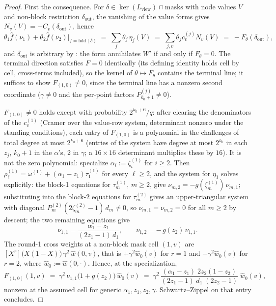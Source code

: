 \documentclass{article}
\theoremstyle{definition}
\begin{document}
\begin{proof}
First the consequence. For $\delta \in \ker(L_{\mathrm{view}}) \cap \mathrm{masks}$ with node values $V$ and non-block restriction $\delta_{\mathrm{out}}$, the vanishing of the value forms gives $N_v(V) = -C_v(\delta_{\mathrm{out}})$, hence
\[
\theta_1 \hat{f}(\nu_1) + \theta_2 \hat{f}(\nu_2) \Big|_{f = \mathrm{fold}(\delta)} \;=\; \sum_j \theta_j\, \eta_j(V) \;=\; \sum_{j, v} \theta_j c^{(j)}_v N_v(V) \;=\; - F_\theta(\delta_{\mathrm{out}}) ,
\]
and $\delta_{\mathrm{out}}$ is arbitrary by : the form annihilates $W'$ if and only if $F_\theta = 0$. The terminal direction satisfies $F = 0$ identically (its defining identity holds cell by cell, cross-terms included), so the kernel of $\theta \mapsto F_\theta$ contains the terminal line; it suffices to show $F_{(1,0)} \neq 0$, since the terminal line has a nonzero second coordinate ($\gamma \neq 0$ and the per-point factors $P^{(j)}_{k_0+1} \neq 0$).

$F_{(1,0)} \neq 0$ holds except with probability $2^{k_0+6}/q$: after clearing the denominators of the $c^{(1)}_v$ (Cramer over the value-row system, determinant nonzero under the standing conditions), each entry of $F_{(1,0)}$ is a polynomial in the challenges of total degree at most $2^{k_0 + 6}$ (entries of the system have degree at most $2^{k_0}$ in each $z_j$, $k_0 + 1$ in the $\alpha$'s, $2$ in $\gamma$; a $16 \times 16$ determinant multiplies these by $16$). It is not the zero polynomial: specialize $\alpha_i := \zeta^{(1)}_i$ for $i \geq 2$. Then $\rho^{(1)}_\ell = \omega^{(1)} + (\alpha_1 - z_1)\tau^{(1)}_1$ for every $\ell \geq 2$, and the system for $\eta_1$ solves explicitly: the block-1 equations for $\tau^{(1)}_m$, $m \geq 2$, give $\nu_{m,2} = -g(\zeta^{(1)}_m)\, \nu_{m,1}$; substituting into the block-2 equations for $\tau^{(2)}_m$ gives an upper-triangular system with diagonal $P^{(2)}_m (2\zeta^{(2)}_m - 1)\, d_m \neq 0$, so $\nu_{m,1} = \nu_{m,2} = 0$ for all $m \geq 2$ by descent; the two remaining equations give
\[
\nu_{1,1} = \frac{\alpha_1 - z_1}{(2 z_1 - 1)\, d_1} , \qquad \nu_{1,2} = -\, g(z_2)\, \nu_{1,1} .
\]
The round-1 cross weights at a non-block mask cell $(1, v)$ are $[X^r]\big(X (1-X)\big)\, \gamma^2\, \hat{w}(0, v)$, that is $+\gamma^2 \hat{w}_0(v)$ for $r = 1$ and $-\gamma^2 \hat{w}_0(v)$ for $r = 2$, where $\hat{w}_0 := \hat{w}(0, \cdot)$. Hence, at the specialization,
\[
F_{(1,0)}(1, v) \;=\; \gamma^2\, \nu_{1,1} \big(1 + g(z_2)\big)\, \hat{w}_0(v) \;=\; \gamma^2\, \frac{(\alpha_1 - z_1)\; 2 z_2 (1 - z_2)}{(2z_1 - 1)\; d_1\; (2 z_2 - 1)}\; \hat{w}_0(v) ,
\]
nonzero at the assumed cell for generic $\alpha_1, z_1, z_2, \gamma$. Schwartz--Zippel on that entry concludes.
\end{proof}
\end{document}
